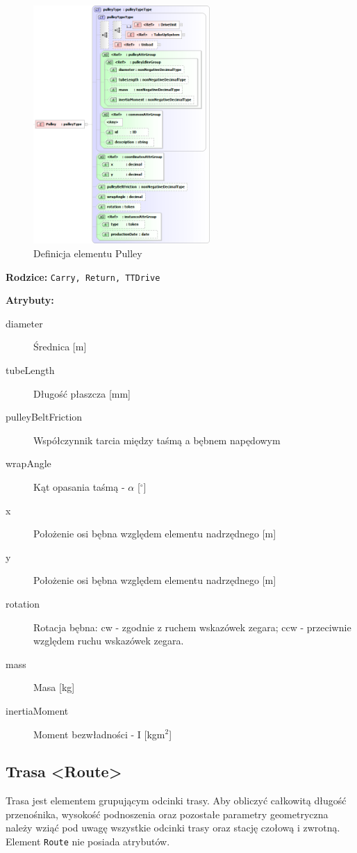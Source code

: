 \documentclass[12pt,a4paper]{article}
\begin{document}
\begin{figure}[H]
  \centering
  \includegraphics[width=0.6\textwidth]{png/liquid/Pulley}
  \caption{Definicja elementu Pulley}
  \label{fig:pulley-xsd}
\end{figure}

\noindent\textbf{Rodzice:} \texttt{Carry, Return, TTDrive}

\noindent\textbf{Atrybuty:}
\begin{description}
\item[diameter] Średnica [m]
\item[tubeLength] Długość płaszcza [mm]
\item[pulleyBeltFriction] Współczynnik tarcia między taśmą a bębnem napędowym
\item[wrapAngle] Kąt opasania taśmą - $\alpha$ [$^\circ$]
\item[x] Położenie osi bębna względem elementu nadrzędnego [m]
\item[y] Położenie osi bębna względem elementu nadrzędnego [m]
\item[rotation] Rotacja bębna: cw - zgodnie z ruchem wskazówek zegara;
	ccw - przeciwnie względem ruchu wskazówek zegara.
\item[mass] Masa [kg]
\item[inertiaMoment] Moment bezwładności - I [kgm$^2$]
\end{description}


\subsection{Trasa <Route>}\label{sec:Route}
Trasa jest elementem grupującym odcinki trasy. Aby obliczyć całkowitą długość
przenośnika, wysokość podnoszenia oraz pozostałe parametry geometryczna należy
wziąć pod uwagę wszystkie odcinki trasy oraz stację czołową i zwrotną.  Element
{\tt Route} nie posiada atrybutów.
\end{document}

